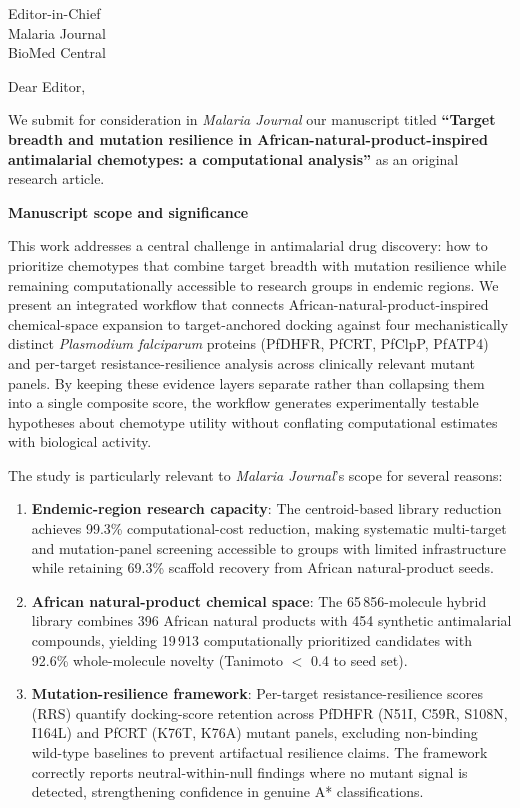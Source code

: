 \documentclass[11pt,a4paper]{letter}
\begin{document}
\begin{letter}{Editor-in-Chief\\
Malaria Journal\\
BioMed Central}

\opening{Dear Editor,}

We submit for consideration in \emph{Malaria Journal} our manuscript titled \textbf{``Target breadth and mutation resilience in African-natural-product-inspired antimalarial chemotypes: a computational analysis''} as an original research article.

\textbf{Manuscript scope and significance}

This work addresses a central challenge in antimalarial drug discovery: how to prioritize chemotypes that combine target breadth with mutation resilience while remaining computationally accessible to research groups in endemic regions. We present an integrated workflow that connects African-natural-product-inspired chemical-space expansion to target-anchored docking against four mechanistically distinct \emph{Plasmodium falciparum} proteins (PfDHFR, PfCRT, PfClpP, PfATP4) and per-target resistance-resilience analysis across clinically relevant mutant panels. By keeping these evidence layers separate rather than collapsing them into a single composite score, the workflow generates experimentally testable hypotheses about chemotype utility without conflating computational estimates with biological activity.

The study is particularly relevant to \emph{Malaria Journal}'s scope for several reasons:

\begin{enumerate}
\item \textbf{Endemic-region research capacity}: The centroid-based library reduction achieves 99.3\% computational-cost reduction, making systematic multi-target and mutation-panel screening accessible to groups with limited infrastructure while retaining 69.3\% scaffold recovery from African natural-product seeds.

\item \textbf{African natural-product chemical space}: The 65\,856-molecule hybrid library combines 396 African natural products with 454 synthetic antimalarial compounds, yielding 19\,913 computationally prioritized candidates with 92.6\% whole-molecule novelty (Tanimoto $<$ 0.4 to seed set).

\item \textbf{Mutation-resilience framework}: Per-target resistance-resilience scores (RRS) quantify docking-score retention across PfDHFR (N51I, C59R, S108N, I164L) and PfCRT (K76T, K76A) mutant panels, excluding non-binding wild-type baselines to prevent artifactual resilience claims. The framework correctly reports neutral-within-null findings where no mutant signal is detected, strengthening confidence in genuine A* classifications.


\end{enumerate}
\end{letter}
\end{document}
